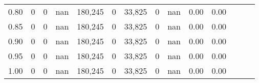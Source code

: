 \begin{tabular}{rrrrrrrrrrrrrr}
0.80 &       0 &      0 &   nan &  180,245 &        0 &  33,825 &       0 &   nan &  0.00 &      0.00 \\
0.85 &       0 &      0 &   nan &  180,245 &        0 &  33,825 &       0 &   nan &  0.00 &      0.00 \\
0.90 &       0 &      0 &   nan &  180,245 &        0 &  33,825 &       0 &   nan &  0.00 &      0.00 \\
0.95 &       0 &      0 &   nan &  180,245 &        0 &  33,825 &       0 &   nan &  0.00 &      0.00 \\
1.00 &       0 &      0 &   nan &  180,245 &        0 &  33,825 &       0 &   nan &  0.00 &      0.00 \\
\bottomrule
\end{tabular}
